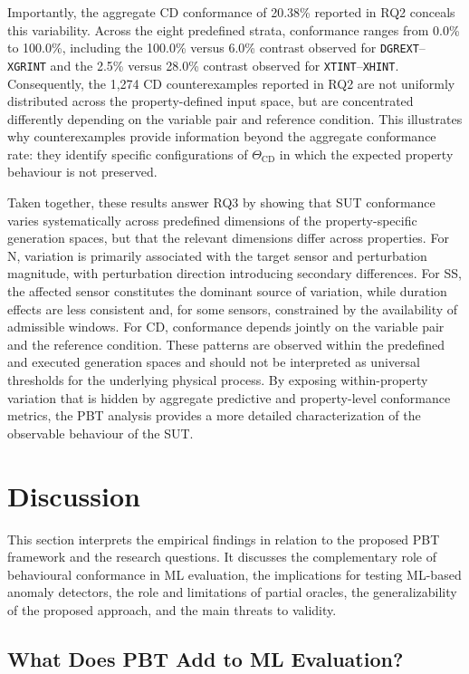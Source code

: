 \documentclass[preprint,12pt]{elsarticle}
\begin{document}
Importantly, the aggregate CD conformance of 20.38\% reported in RQ2
conceals this variability. Across the eight predefined strata, conformance
ranges from 0.0\% to 100.0\%, including the 100.0\% versus 6.0\% contrast
observed for \texttt{DGREXT}--\texttt{XGRINT} and the 2.5\% versus 28.0\%
contrast observed for \texttt{XTINT}--\texttt{XHINT}. Consequently, the 1,274 CD counterexamples reported in RQ2 are not
uniformly distributed across the property-defined input space, but are
concentrated differently depending on the variable pair and reference
condition. This illustrates why counterexamples provide information beyond the
aggregate conformance rate: they identify specific configurations of
\(\Theta_{\mathrm{CD}}\) in which the expected property behaviour is not
preserved.

Taken together, these results answer RQ3 by showing that SUT conformance
varies systematically across predefined dimensions of the property-specific
generation spaces, but that the relevant dimensions differ across
properties. For N, variation is primarily associated with the target sensor
and perturbation magnitude, with perturbation direction introducing
secondary differences. For SS, the affected sensor constitutes the dominant
source of variation, while duration effects are less consistent and, for
some sensors, constrained by the availability of admissible windows. For CD,
conformance depends jointly on the variable pair and the reference condition.
These patterns are observed within the predefined and executed generation
spaces and should not be interpreted as universal thresholds for the
underlying physical process. By exposing within-property variation that is
hidden by aggregate predictive and property-level conformance metrics, the
PBT analysis provides a more detailed characterization of the observable
behaviour of the SUT.

\section{Discussion}
\label{sec:discussion}

This section interprets the empirical findings in relation to the proposed
PBT framework and the research questions. It discusses the complementary
role of behavioural conformance in ML evaluation, the implications for
testing ML-based anomaly detectors, the role and limitations of partial
oracles, the generalizability of the proposed approach, and the main threats
to validity.

\subsection{What Does PBT Add to ML Evaluation?}
\label{sec:discussion_pbt_ml}
\end{document}

